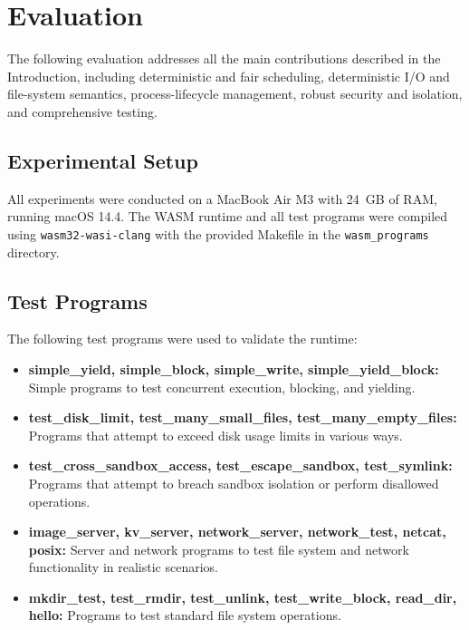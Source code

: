 \documentclass[10pt,a4paper,twocolumn]{IEEEtran}
\begin{document}
\section{Evaluation}\label{sec:evaluation}

The following evaluation addresses all the main contributions described in the Introduction, including deterministic and fair scheduling, deterministic I/O and file-system semantics, process-lifecycle management, robust security and isolation, and comprehensive testing.

\subsection{Experimental Setup}
All experiments were conducted on a MacBook Air M3 with 24~GB of RAM, running macOS 14.4. The WASM runtime and all test programs were compiled using \texttt{wasm32-wasi-clang} with the provided Makefile in the \texttt{wasm\_programs} directory.

\subsection{Test Programs}
The following test programs were used to validate the runtime:
\begin{itemize}
    \item \textbf{simple\_yield, simple\_block, simple\_write, simple\_yield\_block:} Simple programs to test concurrent execution, blocking, and yielding.
    \item \textbf{test\_disk\_limit, test\_many\_small\_files, test\_many\_empty\_files:} Programs that attempt to exceed disk usage limits in various ways.
    \item \textbf{test\_cross\_sandbox\_access, test\_escape\_sandbox, test\_symlink:} Programs that attempt to breach sandbox isolation or perform disallowed operations.
    \item \textbf{image\_server, kv\_server, network\_server, network\_test, netcat, posix:} Server and network programs to test file system and network functionality in realistic scenarios.
    \item \textbf{mkdir\_test, test\_rmdir, test\_unlink, test\_write\_block, read\_dir, hello:} Programs to test standard file system operations.
\end{itemize}
\end{document}
